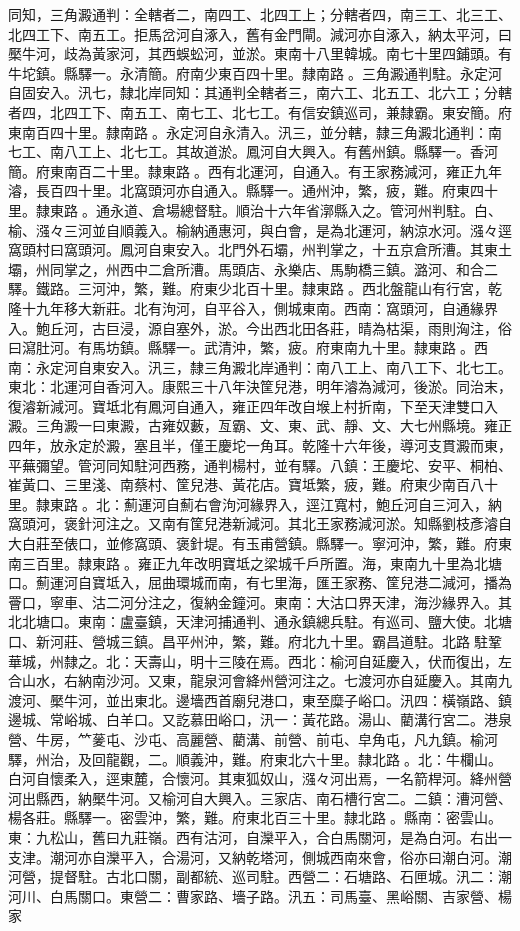 \begin{pinyinscope}
同知，三角澱通判：全轄者二，南四工、北四工上；分轄者四，南三工、北三工、北四工下、南五工。拒馬岔河自涿入，舊有金門閘。減河亦自涿入，納太平河，曰檿牛河，歧為黃家河，其西蜈蚣河，並淤。東南十八里韓城。南七十里四鋪頭。有牛坨鎮。縣驛一。永清簡。府南少東百四十里。隸南路。三角澱通判駐。永定河自固安入。汛七，隸北岸同知：其通判全轄者三，南六工、北五工、北六工；分轄者四，北四工下、南五工、南七工、北七工。有信安鎮巡司，兼隸霸。東安簡。府東南百四十里。隸南路。永定河自永清入。汛三，並分轄，隸三角澱北通判：南七工、南八工上、北七工。其故道淤。鳳河自大興入。有舊州鎮。縣驛一。香河簡。府東南百二十里。隸東路。西有北運河，自通入。有王家務減河，雍正九年濬，長百四十里。北窩頭河亦自通入。縣驛一。通州沖，繁，疲，難。府東四十里。隸東路。通永道、倉場總督駐。順治十六年省漷縣入之。管河州判駐。白、榆、漒々三河並自順義入。榆納通惠河，與白會，是為北運河，納涼水河。漒々逕窩頭村曰窩頭河。鳳河自東安入。北門外石壩，州判掌之，十五京倉所漕。其東土壩，州同掌之，州西中二倉所漕。馬頭店、永樂店、馬駒橋三鎮。潞河、和合二驛。鐵路。三河沖，繁，難。府東少北百十里。隸東路。西北盤龍山有行宮，乾隆十九年移大新莊。北有泃河，自平谷入，側城東南。西南：窩頭河，自通緣界入。鮑丘河，古巨浸，源自塞外，淤。今出西北田各莊，晴為枯渠，雨則洶注，俗曰瀉肚河。有馬坊鎮。縣驛一。武清沖，繁，疲。府東南九十里。隸東路。西南：永定河自東安入。汛三，隸三角澱北岸通判：南八工上、南八工下、北七工。東北：北運河自香河入。康熙三十八年決筐兒港，明年濬為減河，後淤。同治末，復濬新減河。寶坻北有鳳河自通入，雍正四年改自堠上村折南，下至天津雙口入澱。三角澱一曰東澱，古雍奴藪，亙霸、文、東、武、靜、文、大七州縣境。雍正四年，放永定於澱，塞且半，僅王慶坨一角耳。乾隆十六年後，導河支貫澱而東，平蕪彌望。管河同知駐河西務，通判楊村，並有驛。八鎮：王慶坨、安平、桐柏、崔黃口、三里淺、南蔡村、筐兒港、黃花店。寶坻繁，疲，難。府東少南百八十里。隸東路。北：薊運河自薊右會泃河緣界入，逕江寬村，鮑丘河自三河入，納窩頭河，褒針河注之。又南有筐兒港新減河。其北王家務減河淤。知縣劉枝彥濬自大白莊至俵口，並修窩頭、褒針堤。有玉甫營鎮。縣驛一。寧河沖，繁，難。府東南三百里。隸東路。雍正九年改明寶坻之梁城千戶所置。海，東南九十里為北塘口。薊運河自寶坻入，屈曲環城而南，有七里海，匯王家務、筐兒港二減河，播為罾口，寧車、沽二河分注之，復納金鐘河。東南：大沽口界天津，海沙緣界入。其北北塘口。東南：盧臺鎮，天津河捕通判、通永鎮總兵駐。有巡司、鹽大使。北塘口、新河莊、營城三鎮。昌平州沖，繁，難。府北九十里。霸昌道駐。北路駐鞏華城，州隸之。北：天壽山，明十三陵在焉。西北：榆河自延慶入，伏而復出，左合山水，右納南沙河。又東，龍泉河會絳州營河注之。七渡河亦自延慶入。其南九渡河、檿牛河，並出東北。邊墻西首廟兒港口，東至糜子峪口。汛四：橫嶺路、鎮邊城、常峪城、白羊口。又訖慕田峪口，汛一：黃花路。湯山、藺溝行宮二。港泉營、牛房，𥫗蓌屯、沙屯、高麗營、藺溝、前營、前屯、皁角屯，凡九鎮。榆河驛，州治，及回龍觀，二。順義沖，難。府東北六十里。隸北路。北：牛欄山。白河自懷柔入，逕東麓，合懷河。其東狐奴山，漒々河出焉，一名箭桿河。絳州營河出縣西，納檿牛河。又榆河自大興入。三家店、南石槽行宮二。二鎮：漕河營、楊各莊。縣驛一。密雲沖，繁，難。府東北百三十里。隸北路。縣南：密雲山。東：九松山，舊曰九莊嶺。西有沽河，自灤平入，合白馬關河，是為白河。右出一支津。潮河亦自灤平入，合湯河，又納乾塔河，側城西南來會，俗亦曰潮白河。潮河營，提督駐。古北口關，副都統、巡司駐。西營二：石塘路、石匣城。汛二：潮河川、白馬關口。東營二：曹家路、墻子路。汛五：司馬臺、黑峪關、吉家營、楊家
\end{pinyinscope}
